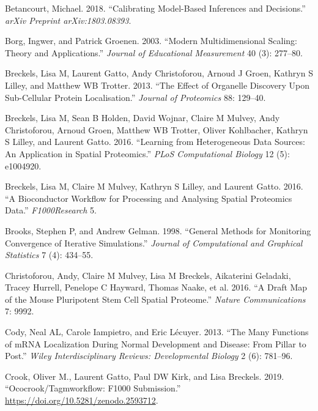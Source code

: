 \documentclass[
]{article}
\begin{document}
\leavevmode\hypertarget{ref-Betancourt:2018}{}%
Betancourt, Michael. 2018. ``Calibrating Model-Based Inferences and
Decisions.'' \emph{arXiv Preprint arXiv:1803.08393}.

\leavevmode\hypertarget{ref-Borg:2003}{}%
Borg, Ingwer, and Patrick Groenen. 2003. ``Modern Multidimensional
Scaling: Theory and Applications.'' \emph{Journal of Educational
Measurement} 40 (3): 277--80.

\leavevmode\hypertarget{ref-Breckels:2013}{}%
Breckels, Lisa M, Laurent Gatto, Andy Christoforou, Arnoud J Groen,
Kathryn S Lilley, and Matthew WB Trotter. 2013. ``The Effect of
Organelle Discovery Upon Sub-Cellular Protein Localisation.''
\emph{Journal of Proteomics} 88: 129--40.

\leavevmode\hypertarget{ref-Breckels:2016}{}%
Breckels, Lisa M, Sean B Holden, David Wojnar, Claire M Mulvey, Andy
Christoforou, Arnoud Groen, Matthew WB Trotter, Oliver Kohlbacher,
Kathryn S Lilley, and Laurent Gatto. 2016. ``Learning from Heterogeneous
Data Sources: An Application in Spatial Proteomics.'' \emph{PLoS
Computational Biology} 12 (5): e1004920.

\leavevmode\hypertarget{ref-Breckels:2016b}{}%
Breckels, Lisa M, Claire M Mulvey, Kathryn S Lilley, and Laurent Gatto.
2016. ``A Bioconductor Workflow for Processing and Analysing Spatial
Proteomics Data.'' \emph{F1000Research} 5.

\leavevmode\hypertarget{ref-Brooks:1998}{}%
Brooks, Stephen P, and Andrew Gelman. 1998. ``General Methods for
Monitoring Convergence of Iterative Simulations.'' \emph{Journal of
Computational and Graphical Statistics} 7 (4): 434--55.

\leavevmode\hypertarget{ref-hyper}{}%
Christoforou, Andy, Claire M Mulvey, Lisa M Breckels, Aikaterini
Geladaki, Tracey Hurrell, Penelope C Hayward, Thomas Naake, et al. 2016.
``A Draft Map of the Mouse Pluripotent Stem Cell Spatial Proteome.''
\emph{Nature Communications} 7: 9992.

\leavevmode\hypertarget{ref-Cody:2013}{}%
Cody, Neal AL, Carole Iampietro, and Eric Lécuyer. 2013. ``The Many
Functions of mRNA Localization During Normal Development and Disease:
From Pillar to Post.'' \emph{Wiley Interdisciplinary Reviews:
Developmental Biology} 2 (6): 781--96.

\leavevmode\hypertarget{ref-oliver_m_crook_2019_2593712}{}%
Crook, Oliver M., Laurent Gatto, Paul DW Kirk, and Lisa Breckels. 2019.
``Ococrook/Tagmworkflow: F1000 Submission.''
\url{https://doi.org/10.5281/zenodo.2593712}.
\end{document}
